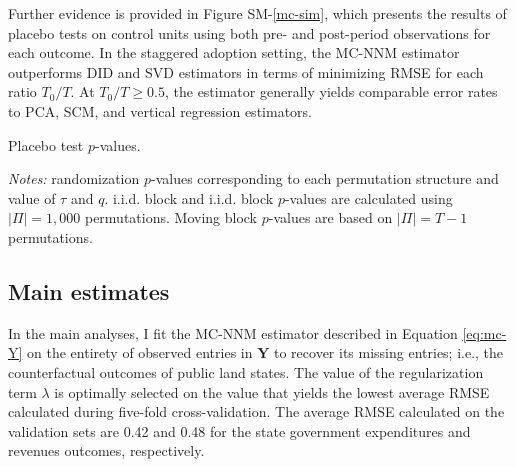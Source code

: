 \documentclass[12pt]{article}
\begin{document}
Further evidence is provided in Figure SM-\ref{mc-sim}, which presents the results of placebo tests on control units using both pre- and post-period observations for each outcome. In the staggered adoption setting, the MC-NNM estimator outperforms DID and SVD estimators in terms of minimizing RMSE for each ratio $T_0/T$. At $T_0/T \geq 0.5$, the estimator generally yields comparable error rates to PCA, SCM, and vertical regression estimators. 

\begin{table}[htbp]
	\captionsetup{font=normalsize}
	\caption{Placebo test $p$-values.\label{placebo-tests}}
	\begin{center}
	\scalebox{.95}{}
	\end{center}
	\footnotesize{\emph{Notes:} randomization $p$-values corresponding to each permutation structure and value of $\tau$ and $q$. i.i.d. block and i.i.d. block $p$-values are calculated using $|\Pi| = 1,000$ permutations. Moving block $p$-values are based on $|\Pi| = T-1$ permutations.}
\end{table}

\subsection{Main estimates}

In the main analyses, I fit the MC-NNM estimator described in Equation \ref{eq:mc-Y} on the entirety of observed entries in $\mathbf{Y}$ to recover its missing entries; i.e., the counterfactual outcomes of public land states. The value of the regularization term $\lambda$ is optimally selected on the value that yields the lowest average RMSE calculated during five-fold cross-validation. The average RMSE calculated on the validation sets are 0.42 and 0.48 for the state government expenditures and revenues outcomes, respectively. 
\end{document}
